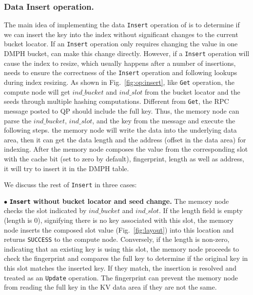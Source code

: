 \subsubsection{Data Insert operation.}
\label{sec:design:insert}
The main idea of implementing the data \texttt{Insert} operation of \sys is to determine if we can insert the key into the index without significant changes to the current bucket locator.
If an \texttt{Insert} operation only requires changing the value in one DMPH bucket, \sys can make this change directly. 
However, if a \texttt{Insert} operation will cause the index to resize, which usually happens after a number of insertions, \sys needs to ensure the correctness of the \texttt{Insert} operation and following lookups during index resizing. 
As shown in Fig.~\ref{fig:op:insert}, like \texttt{Get} operation, the compute node will get $ind\_bucket$ and $ind\_slot$ from the bucket locator and the seeds through multiple hashing computations. Different from \texttt{Get}, the RPC message posted to QP should include the full key. 
Thus, the memory node can parse the $ind\_bucket$, $ind\_slot$, and the key from the message and execute the following steps. 
 the memory node will write the data into the underlying data area, then it can get the data length and the address (offset in the data area) for indexing. 
After the memory node composes the value from the corresponding slot with the cache bit (set to zero by default), fingerprint, length as well as address, it  will try to insert it in the DMPH table. 

We discuss the rest of \texttt{Insert} in three cases:

$\bullet$ \textbf{\texttt{Insert} without bucket locator and seed change.} 
The memory node checks the slot indicated by $ind\_bucket$ and $ind\_slot$. If the length field is empty (length is 0), signifying there is no key associated with this slot, the memory node inserts the composed slot value (Fig.~\ref{fig:layout}) into this location and returns \texttt{SUCCESS} to the compute node. Conversely, if the length is non-zero, indicating that an existing key is using this slot, the memory node proceeds to check the fingerprint and compares the full key to determine if the original key in this slot matches the inserted key. If they match, the insertion is resolved and treated as an \texttt{Update} operation. The fingerprint can prevent the memory node from reading the full key in the KV data area if they are not the same.


